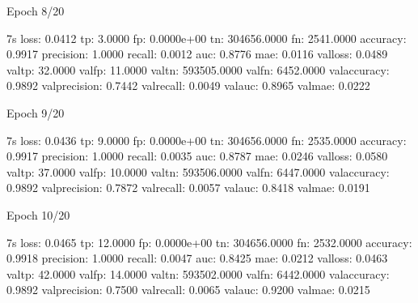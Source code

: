\documentclass[letterpaper,10pt,english]{sphinxmanual}
\begin{document}
\begin{sphinxVerbatim}[commandchars=\\\{\}]
Epoch 8/20
\end{sphinxVerbatim}

\begin{sphinxVerbatim}[commandchars=\\\{\}]
 \PYGZhy{} 7s \PYGZhy{} loss: 0.0412 \PYGZhy{} tp: 3.0000 \PYGZhy{} fp: 0.0000e+00 \PYGZhy{} tn: 304656.0000 \PYGZhy{} fn: 2541.0000 \PYGZhy{} accuracy: 0.9917 \PYGZhy{} precision: 1.0000 \PYGZhy{} recall: 0.0012 \PYGZhy{} auc: 0.8776 \PYGZhy{} mae: 0.0116 \PYGZhy{} val\PYGZus{}loss: 0.0489 \PYGZhy{} val\PYGZus{}tp: 32.0000 \PYGZhy{} val\PYGZus{}fp: 11.0000 \PYGZhy{} val\PYGZus{}tn: 593505.0000 \PYGZhy{} val\PYGZus{}fn: 6452.0000 \PYGZhy{} val\PYGZus{}accuracy: 0.9892 \PYGZhy{} val\PYGZus{}precision: 0.7442 \PYGZhy{} val\PYGZus{}recall: 0.0049 \PYGZhy{} val\PYGZus{}auc: 0.8965 \PYGZhy{} val\PYGZus{}mae: 0.0222
\end{sphinxVerbatim}

\begin{sphinxVerbatim}[commandchars=\\\{\}]
Epoch 9/20
\end{sphinxVerbatim}

\begin{sphinxVerbatim}[commandchars=\\\{\}]
 \PYGZhy{} 7s \PYGZhy{} loss: 0.0436 \PYGZhy{} tp: 9.0000 \PYGZhy{} fp: 0.0000e+00 \PYGZhy{} tn: 304656.0000 \PYGZhy{} fn: 2535.0000 \PYGZhy{} accuracy: 0.9917 \PYGZhy{} precision: 1.0000 \PYGZhy{} recall: 0.0035 \PYGZhy{} auc: 0.8787 \PYGZhy{} mae: 0.0246 \PYGZhy{} val\PYGZus{}loss: 0.0580 \PYGZhy{} val\PYGZus{}tp: 37.0000 \PYGZhy{} val\PYGZus{}fp: 10.0000 \PYGZhy{} val\PYGZus{}tn: 593506.0000 \PYGZhy{} val\PYGZus{}fn: 6447.0000 \PYGZhy{} val\PYGZus{}accuracy: 0.9892 \PYGZhy{} val\PYGZus{}precision: 0.7872 \PYGZhy{} val\PYGZus{}recall: 0.0057 \PYGZhy{} val\PYGZus{}auc: 0.8418 \PYGZhy{} val\PYGZus{}mae: 0.0191
\end{sphinxVerbatim}

\begin{sphinxVerbatim}[commandchars=\\\{\}]
Epoch 10/20
\end{sphinxVerbatim}

\begin{sphinxVerbatim}[commandchars=\\\{\}]
 \PYGZhy{} 7s \PYGZhy{} loss: 0.0465 \PYGZhy{} tp: 12.0000 \PYGZhy{} fp: 0.0000e+00 \PYGZhy{} tn: 304656.0000 \PYGZhy{} fn: 2532.0000 \PYGZhy{} accuracy: 0.9918 \PYGZhy{} precision: 1.0000 \PYGZhy{} recall: 0.0047 \PYGZhy{} auc: 0.8425 \PYGZhy{} mae: 0.0212 \PYGZhy{} val\PYGZus{}loss: 0.0463 \PYGZhy{} val\PYGZus{}tp: 42.0000 \PYGZhy{} val\PYGZus{}fp: 14.0000 \PYGZhy{} val\PYGZus{}tn: 593502.0000 \PYGZhy{} val\PYGZus{}fn: 6442.0000 \PYGZhy{} val\PYGZus{}accuracy: 0.9892 \PYGZhy{} val\PYGZus{}precision: 0.7500 \PYGZhy{} val\PYGZus{}recall: 0.0065 \PYGZhy{} val\PYGZus{}auc: 0.9200 \PYGZhy{} val\PYGZus{}mae: 0.0215
\end{sphinxVerbatim}
\end{document}
